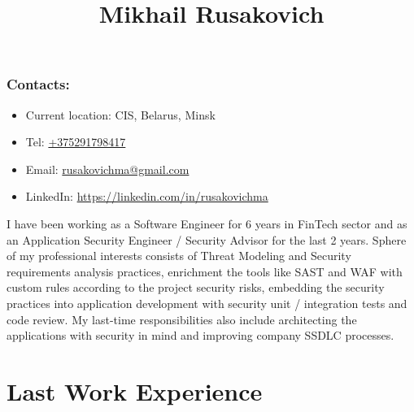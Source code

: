 \documentclass[a4paper, 12pt]{article}
\title{Mikhail Rusakovich}
\author{}
\date{}
\begin{document}
\maketitle

\subsubsection*{Contacts:}
\begin{itemize}
	\item Current location: CIS, Belarus, Minsk
    \item Tel: \href{tel:+375291798417}{+375291798417}
    \item Email: \href{mailto:rusakovichma@gmail.com}{rusakovichma@gmail.com}
    \item LinkedIn: \href{https://linkedin.com/in/rusakovichma
}{https://linkedin.com/in/rusakovichma}
\end{itemize}

I have been working as a Software Engineer for 6 years in FinTech sector and as an Application Security Engineer / Security Advisor for the last 2 years. Sphere of my professional interests consists of Threat Modeling and Security requirements analysis practices, enrichment the tools like SAST and WAF with custom rules according to the project security risks, embedding the security practices into application development with security unit / integration tests and code review. My last-time responsibilities also include architecting the applications with security in mind and improving company SSDLC processes.

\section*{Last Work Experience}
\end{document}
